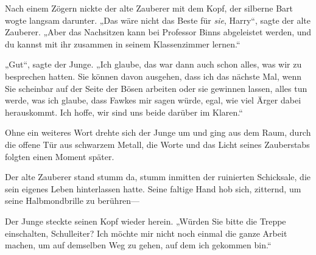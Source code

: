 Nach einem Zögern nickte der alte Zauberer mit dem Kopf, der silberne Bart wogte langsam darunter. „Das wäre nicht das Beste für \emph{sie}, Harry“, sagte der alte Zauberer. „Aber das Nachsitzen kann bei Professor Binns abgeleistet werden, und du kannst mit ihr zusammen in seinem Klassenzimmer lernen.“

„Gut“, sagte der Junge. „Ich glaube, das war dann auch schon alles, was wir zu besprechen hatten. Sie können davon ausgehen, dass ich das nächste Mal, wenn Sie scheinbar auf der Seite der Bösen arbeiten oder sie gewinnen lassen, alles tun werde, was ich glaube, dass Fawkes mir sagen würde, egal, wie viel Ärger dabei herauskommt. Ich hoffe, wir sind uns beide darüber im Klaren.“

Ohne ein weiteres Wort drehte sich der Junge um und ging aus dem Raum, durch die offene Tür aus schwarzem Metall, die Worte  und das Licht seines Zauberstabs folgten einen Moment später.

Der alte Zauberer stand stumm da, stumm inmitten der ruinierten Schicksale, die sein eigenes Leben hinterlassen hatte. Seine faltige Hand hob sich, zitternd, um seine Halbmondbrille zu berühren—

Der Junge steckte seinen Kopf wieder herein. „Würden Sie bitte die Treppe einschalten, Schulleiter? Ich möchte mir nicht noch einmal die ganze Arbeit machen, um auf demselben Weg zu gehen, auf dem ich gekommen bin.“

